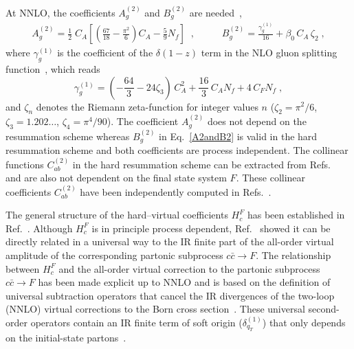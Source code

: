 \documentclass[12pt]{article}
\def\beeq{\begin{eqnarray}}
\def\eeeq{\end{eqnarray}}
\DeclareRobustCommand{\qt}{\ensuremath{q_T}\xspace}
\begin{document}
\begin{appendix}
At NNLO, the coefficients $A^{(2)}_{g}$ and $B^{(2)}_{g}$ are needed~\cite{Bozzi:2005wk,Catani:2013tia,deFlorian:2001zd},
\beeq
\label{A2andB2}
A^{(2)}_{g}= \frac{1}{2}\; C_A \left[ \left( \frac{67}{18} - \frac{\pi^2}{6}
\right) C_A - \frac{5}{9} N_f \right] \;\;,\;\;\;\;\;\;\;\;\;\;B^{(2)}_{g}=\frac{\gamma_{g}^{(1)}}{16}+\beta_0\, C_A\,\zeta_2\;,
\eeeq
where $\gamma_{g}^{(1)}$ is the coefficient of the $\delta(1-z)$ term in the NLO gluon splitting function~\cite{Curci:1980uw,Furmanski:1980cm}, which reads
\begin{equation}
\gamma_{g}^{(1)}= \left(-\frac{64}3-24\zeta_3\right)\,C_A^2
+\frac{16}3\,C_A N_f
+4\,C_F N_f\;,
\label{ga1g}
\end{equation}
and $\zeta_n$ denotes the Riemann zeta-function for integer values $n$ ($\zeta_2=\pi^2/6$, $\zeta_3=1.202\dots$, $\zeta_4=\pi^4/90$). The coefficient $A^{(2)}_{g}$ does not depend on the resummation scheme whereas $B^{(2)}_{g}$  in Eq.~\eqref{A2andB2} is valid in the hard resummation scheme and both coefficients are process independent. The collinear functions $C^{(2)}_{ab}$ in the hard resummation scheme can be extracted from Refs.~\cite{Catani:2013tia,Catani:2011kr,Catani:2012qa} and are also not dependent on the final state system $F$. These collinear coefficients $C^{(2)}_{ab}$ have been independently computed in Refs.~\cite{Gehrmann:2012ze,Echevarria:2016scs}.

The general structure of the hard--virtual coefficients $H^{F}_{c}$ has been established in Ref.~\cite{Catani:2013tia}. Although $H^{F}_{c}$ is in principle process dependent, Ref.~\cite{Catani:2013tia} showed it can be directly related in a universal way to the IR finite part of the all-order virtual amplitude of the corresponding partonic subprocess $c{\bar c}\to F$. The relationship between $H^{F}_{c}$ and the all-order virtual correction to the  partonic subprocess $c{\bar c}\to F$ has been made explicit up to NNLO and is based on the definition of universal subtraction operators that cancel the IR divergences of the two-loop (NNLO) virtual corrections to the Born cross section~\cite{Catani:1998bh}. These universal second-order operators contain an IR finite term of soft origin ($\delta^{(1)}_{\qt}$) that only depends on the initial-state partons~\cite{Catani:2013tia}.


\end{appendix}
\end{document}
